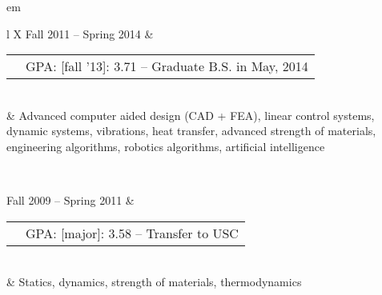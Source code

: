 


	
{ em
\begin{tabu}{ L{\tabularIndent} X } \hhline{==}
	Fall 2011 -- Spring 2014 & 
	\begin{tabular}{ l | l }
		\mysubsection{University of Southern California} & GPA: [fall '13]: 3.71 -- Graduate B.S. in May, 2014 \\ \cline{1-1}
	\end{tabular}
	\\
	&
	Advanced computer aided design (CAD + FEA), linear control systems, dynamic systems, vibrations, heat transfer, advanced strength of materials, engineering algorithms, robotics algorithms, artificial intelligence

\\ \hhline{==}

	Fall 2009 -- Spring 2011 & 
	\begin{tabular}{ l | l }
		\mysubsection{University of Massachusetts, Amherst} & GPA: [major]: 3.58 -- Transfer to USC \\ \cline{1-1}
	\end{tabular}
	\\
	& Statics, dynamics, strength of materials, thermodynamics
\end{tabu}}